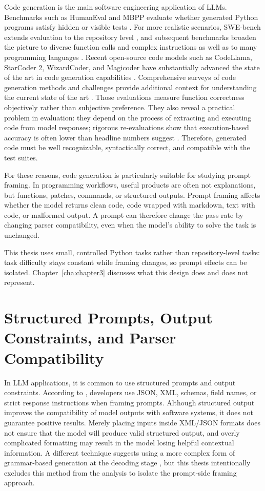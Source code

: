 Code generation is the main software engineering application of LLMs. Benchmarks such as HumanEval and MBPP evaluate whether generated Python programs satisfy hidden or visible tests \cite{chen2021codex, austin2021mbpp}. For more realistic scenarios, SWE-bench extends evaluation to the repository level \cite{jimenez2023swebench}, and subsequent benchmarks broaden the picture to diverse function calls and complex instructions \cite{zhuo2024bigcodebench} as well as to many programming languages \cite{cassano2023multipl}. Recent open-source code models such as CodeLlama, StarCoder 2, WizardCoder, and Magicoder have substantially advanced the state of the art in code generation capabilities \cite{roziere2023code, lozhkov2024star, luo2024wizard, wei2024magicoder}. Comprehensive surveys of code generation methods and challenges provide additional context for understanding the current state of the art \cite{jiang2024code}. Those evaluations measure function correctness objectively rather than subjective preference. They also reveal a practical problem in evaluation: they depend on the process of extracting and executing code from model responses; rigorous re-evaluations show that execution-based accuracy is often lower than headline numbers suggest \cite{liu2023nece}. Therefore, generated code must be well recognizable, syntactically correct, and compatible with the test suites.

For these reasons, code generation is particularly suitable for studying prompt framing. In programming workflows, useful products are often not explanations, but functions, patches, commands, or structured outputs. Prompt framing affects whether the model returns clean code, code wrapped with markdown, text with code, or malformed output. A prompt can therefore change the pass rate by changing parser compatibility, even when the model's ability to solve the task is unchanged.

This thesis uses small, controlled Python tasks rather than repository-level tasks: task difficulty stays constant while framing changes, so prompt effects can be isolated. Chapter~\ref{cha:chapter3} discusses what this design does and does not represent.

\section{Structured Prompts, Output Constraints, and Parser Compatibility}

In LLM applications, it is common to use structured prompts and output constraints. According to \cite{liu2024structuredoutput}, developers use JSON, XML, schemas, field names, or strict response instructions when framing prompts. Although structured output improves the compatibility of model outputs with software systems, it does not guarantee positive results. Merely placing inputs inside XML/JSON formats does not ensure that the model will produce valid structured output, and overly complicated formatting may result in the model losing helpful contextual information. A different technique suggests using a more complex form of grammar-based generation at the decoding stage \cite{geng2023grammar}, but this thesis intentionally excludes this method from the analysis to isolate the prompt-side framing approach.


